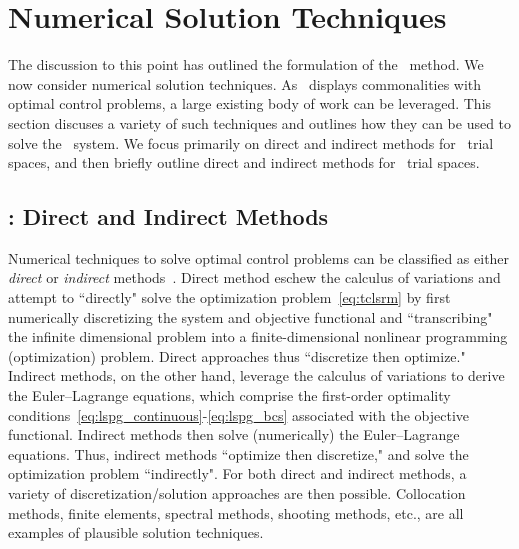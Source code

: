 \section{Numerical Solution Techniques}\label{sec:numerical_techniques}
The discussion to this point has outlined the formulation of the \methodAcronym\ method. We now consider numerical solution techniques. 
As \methodAcronym\ displays commonalities with optimal control problems, a large existing body of work can be leveraged. This section discuses a variety of such techniques and outlines how they can be used to solve the \methodAcronym\ system. We focus primarily on direct and indirect methods for \spatialAcronym\ trial spaces, 
and then briefly outline direct and indirect methods for \spaceTimeAcronym\ trial spaces. 

\subsection{\spatialAcronym: Direct and Indirect Methods}
Numerical techniques to
solve optimal control problems can be classified as either
\textit{direct} or \textit{indirect}
methods~\cite{conway_optimalcontrolreview}. Direct method eschew the calculus of variations 
and attempt to ``directly" solve the optimization problem~\eqref{eq:tclsrm} by first
numerically discretizing the system and objective functional and ``transcribing"
the infinite dimensional problem into a finite-dimensional nonlinear
programming (optimization) problem. Direct approaches thus ``discretize then optimize."
Indirect methods, on the other hand, leverage the calculus of variations to
derive the Euler--Lagrange equations, which comprise the first-order optimality conditions~\eqref{eq:lspg_continuous}-\eqref{eq:lspg_bcs} associated with the objective 
functional. Indirect methods then solve (numerically) the Euler--Lagrange equations. Thus, indirect methods ``optimize then discretize," and 
solve the optimization problem
``indirectly". For both direct and indirect methods, a variety of
discretization/solution approaches are then possible. Collocation methods,
finite elements, spectral methods, shooting methods, etc., are all examples of
plausible solution techniques.  

